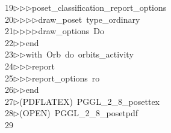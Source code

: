 \begin{tabbing}
19\>$\triangleright$\>$\triangleright$\>$\triangleright$\>poset\_classification\_report\_options\ \\[0pt]
20\>$\triangleright$\>$\triangleright$\>$\triangleright$\>$\triangleright$\>draw\_poset\ type\_ordinary\ \\[0pt]
21\>$\triangleright$\>$\triangleright$\>$\triangleright$\>$\triangleright$\>draw\_options\ Do\ \\[0pt]
22\>$\triangleright$\>$\triangleright$\>end\ \\[0pt]
23\>$\triangleright$\>$\triangleright$\>with\ Orb\ do\ orbits\_activity\ \\[0pt]
24\>$\triangleright$\>$\triangleright$\>$\triangleright$\>report\ \ \\[0pt]
25\>$\triangleright$\>$\triangleright$\>$\triangleright$\>report\_options\ ro\ \\[0pt]
26\>$\triangleright$\>$\triangleright$\>end\ \\[0pt]
27\>$\triangleright$\>(PDFLATEX)\ PGGL\_2\_8\_posettex\\[0pt]
28\>$\triangleright$\>(OPEN)\ PGGL\_2\_8\_posetpdf\\[0pt]
29\>\end{tabbing}
